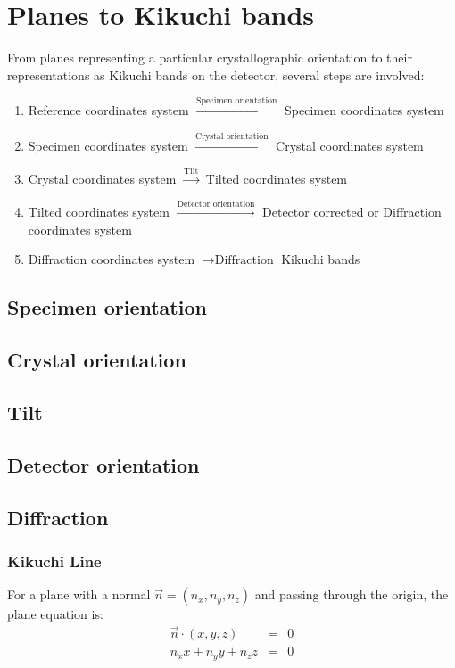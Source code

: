 \documentclass[letterpaper]{article}
\begin{document}
	\section{Planes to Kikuchi bands}
	From planes representing a particular crystallographic orientation to their representations as Kikuchi bands on the detector, several steps are involved:
	\begin{enumerate}
		\item Reference coordinates system $\xrightarrow{\text{Specimen orientation}}$ Specimen coordinates system
		\item Specimen coordinates system $\xrightarrow{\text{Crystal orientation}}$ Crystal coordinates system
		\item Crystal coordinates system $\xrightarrow{\text{Tilt}}$ Tilted coordinates system
		\item Tilted coordinates system $\xrightarrow{\text{Detector orientation}}$ Detector corrected or Diffraction coordinates system
		\item Diffraction coordinates system $\rightarrow{\text{Diffraction}}$ Kikuchi bands
	\end{enumerate}
	
	\subsection{Specimen orientation}
	
	
	\subsection{Crystal orientation}
	
	\subsection{Tilt}
	
	
	\subsection{Detector orientation}
	
	\subsection{Diffraction}
	\subsubsection{Kikuchi Line}
	For a plane with a normal $\vec{n} = (n_x, n_y, n_z)$ and passing through the origin, the plane equation is:
	\begin{eqnarray}
		\vec{n} \cdot (x,y,z) & = & 0\\\nonumber
		n_xx + n_yy + n_zz & = & 0 
		\label{eq:plane}
	\end{eqnarray}
	
\end{document}
